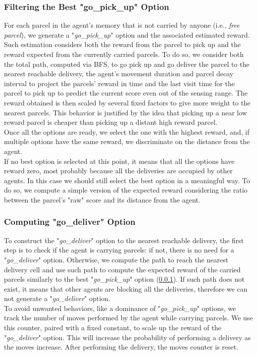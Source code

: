         \subsubsection{Filtering the Best "go\_pick\_up" Option}\label{best_pickup}
            For each parcel in the agent's memory that is not carried by anyone (i.e., \textit{free parcel}), we generate a "\textit{go\_pick\_up}" option and the associated estimated reward. Such estimation considers both the reward from the parcel to pick up and the reward expected from the currently carried parcels. To do so, we consider both the total path, computed via BFS, to go pick up and go deliver the parcel to the nearest reachable delivery, the agent's movement duration and parcel decay interval to project the parcels' reward in time and the last visit time for the parcel to pick up to predict the current score even out of the sensing range. The reward obtained is then scaled by several fixed factors to give more weight to the nearest parcels. This behavior is justified by the idea that picking up a near low reward parcel is cheaper than picking up a distant high reward parcel.
            \medskip\\
            Once all the options are ready, we select the one with the highest reward, and, if multiple options have the same reward, we discriminate on the distance from the agent.
            \medskip\\
            If no best option is selected at this point, it means that all the options have reward zero, most probably because all the deliveries are occupied by other agents. In this case we should still select the best option in a meaningful way. To do so, we compute a simple version of the expected reward considering the ratio between the parcel's "raw" score and its distance from the agent.
        
        \subsubsection{Computing "go\_deliver" Option}
            To construct the "\textit{go\_deliver}" option to the nearest reachable delivery, the first step is to check if the agent is carrying parcels: if not, there is no need for a "\textit{go\_deliver}" option. Otherwise, we compute the path to reach the nearest delivery cell and use such path to compute the expected reward of the carried parcels similarly to the best "\textit{go\_pick\_up}" option (\ref{best_pickup}). If such path does not exist, it means that other agents are blocking all the deliveries, therefore we can not generate a "\textit{go\_deliver}" option.
            \medskip\\
            To avoid unwanted behaviors, like a dominance of "\textit{go\_pick\_up}" options, we track the number of moves performed by the agent while carrying parcels. We use this counter, paired with a fixed constant, to scale up the reward of the "\textit{go\_deliver}" option. This will increase the probability of performing a delivery as the moves increase. After performing the delivery, the moves counter is reset.


